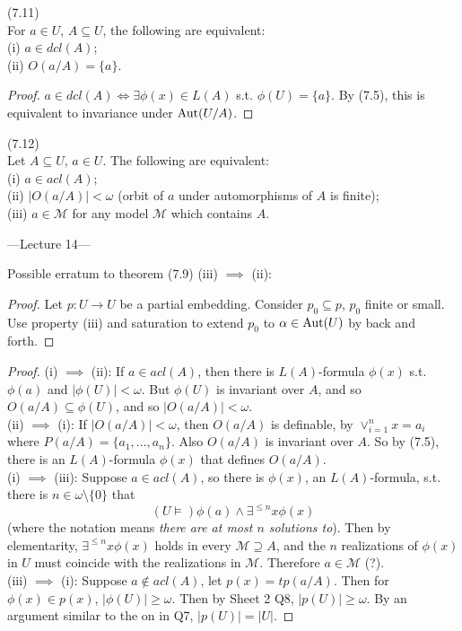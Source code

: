 \documentclass[a4paper]{article}
\begin{document}
\begin{prop} (7.11)\\
    For $a \in U$, $A \subseteq U$, the following are equivalent:\\
    (i) $a \in dcl(A)$;\\
    (ii) $O(a/A) = \{a\}$.
    \begin{proof}
        $a \in dcl(A) \iff \exists \phi(x) \in L(A)$ s.t. $\phi(U) = \{a\}$. By (7.5), this is equivalent to invariance under $\operatorname{Aut}(U/A)$.
    \end{proof}
\end{prop}

\begin{thm} (7.12)\\
    Let $A \subseteq U$, $a \in U$. The following are equivalent:\\
    (i) $a \in acl(A)$;\\
    (ii) $|O(a/A)| < \omega$ (orbit of $a$ under automorphisms of $A$ is finite);\\
    (iii) $a \in \mathcal{M}$ for any model $\mathcal{M}$ which contains $A$.

---Lecture 14---

    Possible erratum to theorem (7.9) (iii) $\implies$ (ii): 
    \begin{proof}
        Let $p:U \to U$ be a partial embedding. Consider $p_0 \subseteq p$, $p_0$ finite or small. Use property (iii) and saturation to extend $p_0$ to $\alpha \in \operatorname{Aut}(U)$ by back and forth.
    \end{proof}

    \begin{proof}
        (i) $\implies$ (ii): If $a \in acl(A)$, then there is $L(A)$-formula $\phi(x)$ s.t. $\phi(a)$ and $|\phi(U)| < \omega$. But $\phi(U)$ is invariant over $A$, and so $O(a/A) \subseteq \phi(U)$, and so $|O(a/A)| < \omega$.\\
        (ii) $\implies$ (i): If $|O(a/A)| < \omega$, then $O(a/A)$ is definable, by $\vee_{i=1}^n x=a_i$ where $P(a/A) = \{a_1,...,a_n\}$. Also $O(a/A)$ is invariant over $A$. So by (7.5), there is an $L(A)$-formula $\phi(x)$ that defines $O(a/A)$.\\
        (i) $\implies$ (iii): Suppose $a \in acl(A)$, so there is $\phi(x)$, an $L(A)$-formula, s.t. there is $n \in \omega \setminus \{0\}$ that
        $$ (U\vDash) \phi(a) \wedge \exists^{\leq n} x \phi(x)$$
        (where the notation means \emph{there are at most $n$ solutions to}). Then by elementarity, $\exists^{\leq n} x \phi(x)$ holds in every $\mathcal{M} \supseteq A$, and the $n$ realizations of $\phi(x)$ in $U$ must coincide with the realizations in $\mathcal{M}$. Therefore $a \in \mathcal{M}$ (?).\\
        (iii) $\implies$ (i): Suppose $a \not\in acl(A)$, let $p(x) = tp(a/A)$. Then for $\phi(x) \in p(x)$, $|\phi(U)| \geq \omega$. Then by Sheet 2 Q8, $|p(U)| \geq \omega$. By an argument similar to the on in Q7, $|p(U)| = |U|$.


\end{proof}
\end{thm}
\end{document}
